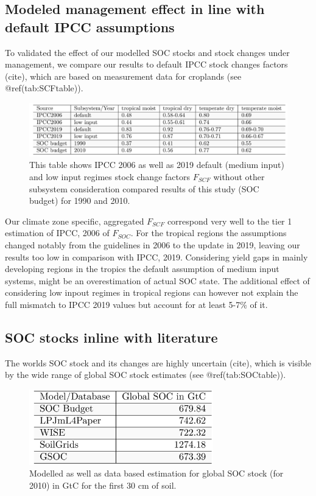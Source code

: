 \documentclass[gc, manuscript]{copernicus}
\begin{document}
\subsection{Modeled management effect in line with default IPCC
assumptions}

To validated the effect of our modelled SOC stocks and stock changes
under management, we compare our results to default IPCC stock changes
factors (cite), which are based on measurement data for croplands (see
@ref(tab:SCFtable)).

\begin{figure}[H]
\includegraphics[width=16cm]{../ResultNotebooks/Output/Images/TableSCF_comparison} \caption{This table shows IPCC 2006 as well as 2019 default (medium input) and low input regimes stock change factors $F_{SCF}$ without other subsystem consideration compared results of this study (SOC budget) for 1990 and 2010.}\label{fig:SCFtable}
\end{figure}

Our climate zone specific, aggregated \(F_{SCF}\) correspond very well
to the tier 1 estimation of IPCC, 2006 of \(F_{SOC}\). For the tropical
regions the assumptions changed notably from the guidelines in 2006 to
the update in 2019, leaving our results too low in comparison with IPCC,
2019. Considering yield gaps in mainly developing regions in the tropics
the default assumption of medium input systems, might be an
overestimation of actual SOC state. The additional effect of considering
low inpout regimes in tropical regions can however not explain the full
mismatch to IPCC 2019 values but account for at least 5-7\% of it.

\subsection{SOC stocks inline with literature}

The worlds SOC stock and its changes are highly uncertain (cite), which
is visible by the wide range of global SOC stock estimates (see
@ref(tab:SOCtable)).

\begin{figure}[H]
\includegraphics[width=8cm]{../ResultNotebooks/Output/Images/TableSOC_comparison} \caption{Modelled as well as data based estimation for global SOC stock (for 2010) in GtC for the first 30 cm of soil.}\label{fig:SOCtable}
\end{figure}
\end{document}
